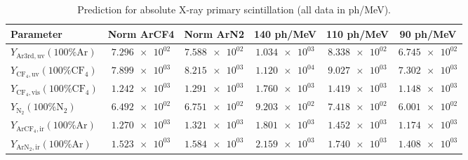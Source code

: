 \begin{table}
\caption{Prediction for absolute X-ray primary scintillation (all data in ph/MeV).}
\label{tab:prediction}
\begin{tabular}{lSSSSS}
\toprule
{Parameter} & {Norm ArCF4} & {Norm ArN2} & {140 ph/MeV} & {110 ph/MeV} & {90 ph/MeV} \\
\midrule
$Y_{\mathrm{Ar3rd,uv}} (100\% \mathrm{Ar})$ & $\num{7.296e+02}$ & $\num{7.588e+02}$ & $\num{1.034e+03}$ & $\num{8.338e+02}$ & $\num{6.745e+02}$ \\
$Y_{\mathrm{CF_4,uv}} (100\% \mathrm{CF_4})$ & $\num{7.899e+03}$ & $\num{8.215e+03}$ & $\num{1.120e+04}$ & $\num{9.027e+03}$ & $\num{7.302e+03}$ \\
$Y_{\mathrm{CF_4,vis}} (100\% \mathrm{CF_4})$ & $\num{1.242e+03}$ & $\num{1.291e+03}$ & $\num{1.760e+03}$ & $\num{1.419e+03}$ & $\num{1.148e+03}$ \\
$Y_{\mathrm{N_2}} (100\% \mathrm{N_2})$ & $\num{6.492e+02}$ & $\num{6.751e+02}$ & $\num{9.203e+02}$ & $\num{7.418e+02}$ & $\num{6.001e+02}$ \\
$Y_{\mathrm{ArCF_4,ir}} (100\% \mathrm{Ar})$ & $\num{1.270e+03}$ & $\num{1.321e+03}$ & $\num{1.801e+03}$ & $\num{1.452e+03}$ & $\num{1.174e+03}$ \\
$Y_{\mathrm{ArN_2,ir}} (100\% \mathrm{Ar})$ & $\num{1.523e+03}$ & $\num{1.584e+03}$ & $\num{2.159e+03}$ & $\num{1.740e+03}$ & $\num{1.408e+03}$ \\
\bottomrule
\end{tabular}
\end{table}
